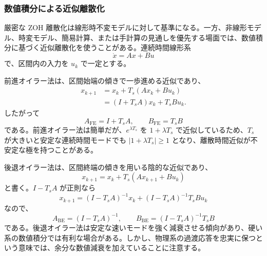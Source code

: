 \subsubsection{数値積分による近似離散化}

厳密な ZOH 離散化は線形時不変モデルに対して基準になる。一方、非線形モデル、時変モデル、簡易計算、または手計算の見通しを優先する場面では、数値積分に基づく近似離散化を使うことがある。連続時間線形系
\begin{equation}
  \dot{x}=Ax+Bu
\end{equation}
で、区間内の入力を $u_k$ で一定とする。

前進オイラー法は、区間始端の傾きで一歩進める近似であり、
\begin{align}
  x_{k+1}
  &=x_k+T_s(Ax_k+Bu_k)\\
  &=(I+T_sA)x_k+T_sB u_k.
\end{align}
したがって
\begin{equation}
  A_{\mathrm{FE}}=I+T_sA,\qquad
  B_{\mathrm{FE}}=T_sB
  \label{eq:forward-euler-discretization}
\end{equation}
である。前進オイラー法は簡単だが、$e^{\lambda T_s}$ を $1+\lambda T_s$ で近似しているため、$T_s$ が大きいと安定な連続時間モードでも $|1+\lambda T_s|\ge1$ となり、離散時間近似が不安定な極を持つことがある。

後退オイラー法は、区間終端の傾きを用いる陰的な近似であり、
\begin{equation}
  x_{k+1}=x_k+T_s(Ax_{k+1}+Bu_k)
\end{equation}
と書く。$I-T_sA$ が正則なら
\begin{equation}
  x_{k+1}=(I-T_sA)^{-1}x_k+(I-T_sA)^{-1}T_sB u_k
\end{equation}
なので、
\begin{equation}
  A_{\mathrm{BE}}=(I-T_sA)^{-1},\qquad
  B_{\mathrm{BE}}=(I-T_sA)^{-1}T_sB
  \label{eq:backward-euler-discretization}
\end{equation}
である。後退オイラー法は安定な速いモードを強く減衰させる傾向があり、硬い系の数値積分では有利な場合がある。しかし、物理系の過渡応答を忠実に保つという意味では、余分な数値減衰を加えていることに注意する。

